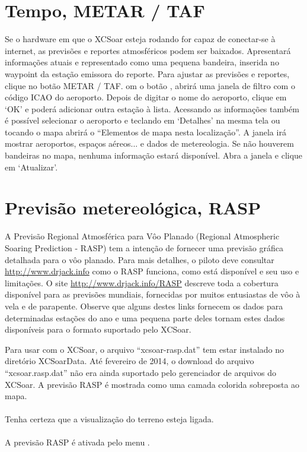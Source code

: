 \section{Tempo, METAR / TAF}\label{sec:metar-taf}

Se o hardware em que o XCSoar esteja rodando for capaz de conectar-se à internet, as previsões e reportes atmosféricos podem ser baixados.    Apresentará informações atuais e representado como uma pequena bandeira, inserida no waypoint da estação emissora do reporte. 
Para ajustar as previsões e reportes, clique no botão METAR / TAF. om o botão
 , abrirá uma janela de filtro com o código ICAO do aeroporto.  Depois de digitar o nome do aeroporto, clique em ‘OK’ e poderá adicionar outra estação à lista.  Acessando as informações também é possível selecionar o aeroporto e teclando em ‘Detalhes’ na mesma tela ou tocando o mapa abrirá o “Elementos de mapa nesta localização”.  A janela irá mostrar aeroportos, espaços aéreos... e dados de metereologia. Se não houverem bandeiras no mapa, nenhuma informação estará disponível.  Abra a janela e clique em ‘Atualizar’.  

\section{Previsão metereológica, RASP}\label{sec:weather-forecast}

A Previsão Regional Atmosférica para Vôo Planado (Regional Atmospheric Soaring Prediction - RASP) tem a intenção de fornecer uma previsão gráfica detalhada para o vôo planado.  Para mais detalhes, o piloto deve consultar  \url{http://www.drjack.info} como o RASP funciona, como está disponível e seu uso e limitações.  
O site \url{http://www.drjack.info/RASP} descreve toda a cobertura disponível para as previsões mundiais, fornecidas por muitos entusiastas de vôo à vela e de parapente.  Observe que alguns destes links fornecem os dados para determinadas estações do ano e uma pequena parte deles tornam estes dados disponíveis para o formato suportado pelo XCSoar.

Para usar com o XCSoar, o arquivo “xcsoar-rasp.dat” tem estar instalado no diretório XCSoarData.  Até fevereiro de 2014, o download do arquivo “xcsoar.rasp.dat” não era ainda suportado pelo gerenciador de arquivos do XCSoar. A previsão RASP é mostrada como uma camada colorida sobreposta ao mapa. \\ \\
Tenha certeza que a visualização do terreno esteja ligada. \tip{} \\ \\
A previsão RASP é ativada pelo menu   
.

